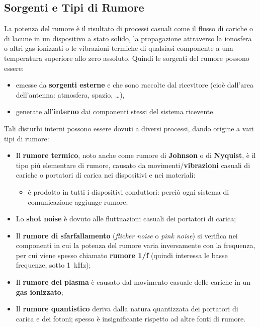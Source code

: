 \documentclass[openany,a4paper,12pt]{book}
\begin{document}
\subsection*{Sorgenti e Tipi di Rumore}

La potenza del rumore è il risultato di processi casuali come il flusso di cariche o di lacune in un dispositivo a stato solido, la propagazione attraverso la ionosfera o altri gas ionizzati o le vibrazioni termiche di qualsiasi componente a una temperatura superiore allo zero assoluto. Quindi le sorgenti del rumore possono essere:

\begin{itemize}[label=\textcolor{PoliBlue}{\textbullet}]
    \item emesse da \textbf{sorgenti esterne} e che sono raccolte dal ricevitore (cioè dall'area dell'antenna: atmosfera, spazio, \dots),
    \item generate all'\textbf{interno} dai componenti stessi del sistema ricevente.
\end{itemize}

Tali disturbi interni possono essere dovuti a diversi processi, dando origine a vari tipi di rumore:

\begin{itemize}[label=\textcolor{PoliBlue}{\textbullet}]
    \item Il \textbf{rumore termico}, noto anche come rumore di \textbf{Johnson} o di \textbf{Nyquist}, è il tipo più elementare di rumore, causato da movimenti/\textbf{vibrazioni} casuali di cariche o portatori di carica nei dispositivi e nei materiali:
    \begin{itemize}[label=$\circ$]
        \item è prodotto in tutti i dispositivi conduttori: perciò ogni sistema di comunicazione aggiunge rumore;
    \end{itemize}
    
    \item Lo \textbf{shot noise} è dovuto alle fluttuazioni casuali dei portatori di carica;
    
    \item Il \textbf{rumore di sfarfallamento} (\textit{flicker noise} o \textit{pink noise}) si verifica nei componenti in cui la potenza del rumore varia inversamente con la frequenza, per cui viene spesso chiamato \textbf{rumore 1/f} (quindi interessa le basse frequenze, sotto \qty{1}{\kilo\hertz});
    
    \item Il \textbf{rumore del plasma} è causato dal movimento casuale delle cariche in un \textbf{gas ionizzato};
    
    \item Il \textbf{rumore quantistico} deriva dalla natura quantizzata dei portatori di carica e dei fotoni; spesso è insignificante rispetto ad altre fonti di rumore.
\end{itemize}
\end{document}
